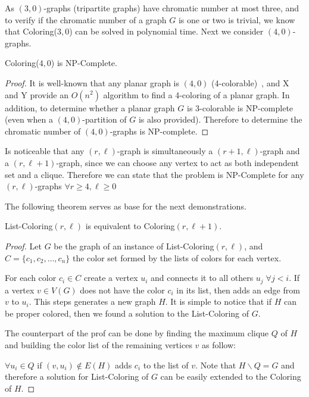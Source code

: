 \documentclass[9pt]{../document-types/entcs} \usepackage{../document-types/entcsmacro}
\newcommand{\?}{\textcolor{warn}{?}}
\begin{document}
As $(3,0)$-graphs (tripartite graphs) have chromatic number at most three, and to verify if the chromatic number of a graph $G$
is one or two is trivial, we know that {\sc Coloring($3,0$)} can be solved in polynomial time.
Next we consider $(4,0)$-graphs.

\begin{lemma}
{\sc Coloring($4,0$)} is NP-Complete.
\end{lemma}
\begin{proof}
It is well-known that any planar graph is $(4,0)$ (4-colorable)~\cite{appel77}, and X and Y provide an $O(n^2)$ algorithm to find a 4-coloring of a planar graph.
In addition, to determine whether a planar graph $G$ is 3-colorable is NP-complete~\cite{larry} (even when a $(4,0)$-partition of $G$ is also provided).
Therefore to determine the chromatic number of $(4,0)$-graphs is NP-complete.
\end{proof}

Is noticeable that any $(r,\ell)$-graph is simultaneously a $(r+1,\ell)$-graph and a $(r,\ell+1)$-graph, since we can choose any vertex to act as both independent set and a clique. Therefore we can state that the problem is NP-Complete for any $(r,\ell)$-graphs $\forall r \geq 4 , \ell \geq 0$

The following theorem serves as base for the next demonstrations.

\begin{theorem}\label{list}
  {\sc List-Coloring$(r,\ell)$} is equivalent to {\sc Coloring$(r,\ell+1)$}.
\end{theorem}
\begin{proof}
    Let $G$ be the graph of an instance of {\sc List-Coloring$(r,\ell)$}, and $C=\{c_1,c_2,\ldots,c_n\}$ the color set formed by the lists of colors for each vertex.

    For each color $c_i \in C$ create a vertex $u_i$ and connects it to all others $u_j\; \forall j < i$. If a vertex $v \in V(G)$ does not have the color $c_i$ in its list, then adds an edge from $v$ to $u_i$. This steps generates a new graph $H$. It is simple to notice that if $H$ can be proper colored, then we found a solution to the {\sc List-Coloring} of $G$.

    The counterpart of the prof can be done by finding the maximum clique $Q$ of $H$ and building the color list of the remaining vertices $v$ as follow:

    $\forall u_i \in Q$ if $(v,u_i) \notin E(H)$ adds $c_i$ to the list of $v$. Note that $H\backslash Q = G$ and therefore a solution for {\sc List-Coloring} of $G$ can be easily extended to the {\sc Coloring} of $H$.
\end{proof}
\end{document}
